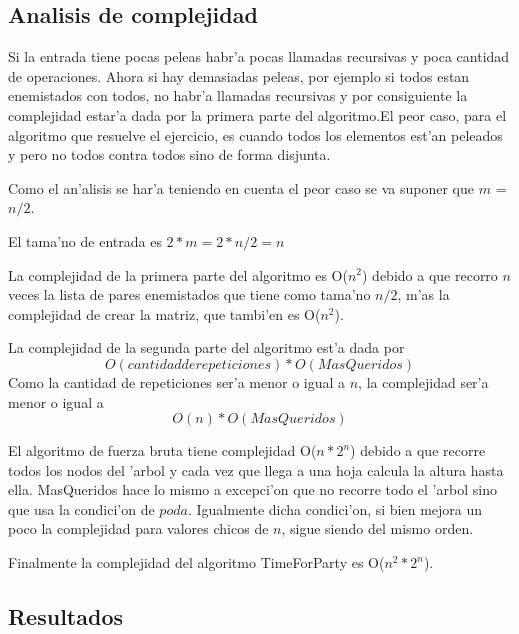 \subsection{Analisis de complejidad}
Si la entrada tiene pocas peleas habr'a pocas llamadas recursivas y poca cantidad de operaciones. Ahora si hay demasiadas peleas, por ejemplo si todos estan enemistados con todos, no habr'a llamadas recursivas y por consiguiente la complejidad estar'a dada por la primera parte del algoritmo.El peor caso, para el algoritmo que resuelve el ejercicio, es cuando todos los elementos est'an peleados y pero no todos contra todos sino de forma disjunta.

Como el an'alisis se har'a teniendo en cuenta el peor caso se va suponer que $m$ = $n/2$. %

El tama'no de entrada es $2 * m = 2* n/2 = n$

La complejidad de la primera parte del algoritmo es O($n^2$) debido a que recorro $n$ veces la lista de pares enemistados que tiene como tama'no $n/2$, m'as la complejidad de crear la matriz, que tambi'en es O($n^2$).

La complejidad de la segunda parte del algoritmo est'a dada por $$O(cantidad de repeticiones)*O(MasQueridos)$$Como la cantidad de repeticiones ser'a menor o igual a $n$, la complejidad ser'a menor o igual a $$O(n)*O(MasQueridos)$$

El algoritmo de fuerza bruta tiene complejidad O($n*2^n$) debido a que recorre todos los nodos del 'arbol y cada vez que llega a una hoja calcula la altura hasta ella. MasQueridos hace lo mismo a excepci'on que no recorre todo el 'arbol sino que usa la condici'on de $poda$. Igualmente dicha condici'on, si bien mejora un poco la complejidad para valores chicos de $n$, sigue siendo del mismo orden.

Finalmente la complejidad del algoritmo TimeForParty es O($n^2*2^n$).

\clearpage
\subsection{Resultados}
\clearpage
